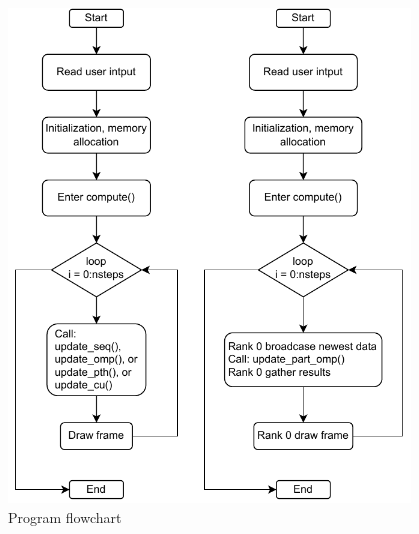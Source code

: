 \documentclass[twoside,12pt]{article}
\theoremstyle{definition}
\theoremstyle{remark}
\begin{document}
\begin{figure}[h!]
    \centering
    \includegraphics[width=0.95\textwidth]{../flowchart.drawio.pdf}
    \caption{Program flowchart}
    \label{fig:flowchart}
\end{figure}
\end{document}

